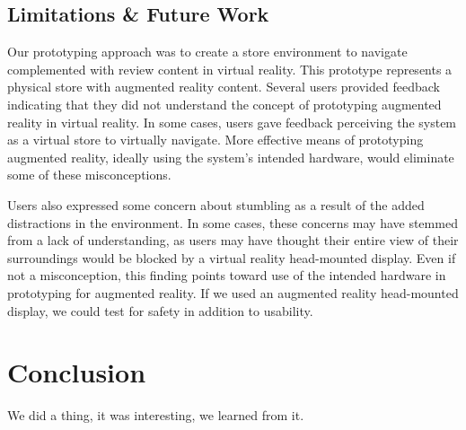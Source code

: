 \subsection{Limitations \& Future Work}
Our prototyping approach was to create a store environment to navigate complemented with review content in virtual reality.  This prototype represents a physical store with augmented reality content.  Several users provided feedback indicating that they did not understand the concept of prototyping augmented reality in virtual reality.  In some cases, users gave feedback perceiving the system as a virtual store to virtually navigate.  More effective means of prototyping augmented reality, ideally using the system's intended hardware, would eliminate some of these misconceptions.

Users also expressed some concern about stumbling as a result of the added distractions in the environment.  In some cases, these concerns may have stemmed from a lack of understanding, as users may have thought their entire view of their surroundings would be blocked by a virtual reality head-mounted display.  Even if not a misconception, this finding points toward use of the intended hardware in prototyping for augmented reality.  If we used an augmented reality head-mounted display, we could test for safety in addition to usability.


\section{Conclusion}
We did a thing, it was interesting, we learned from it.